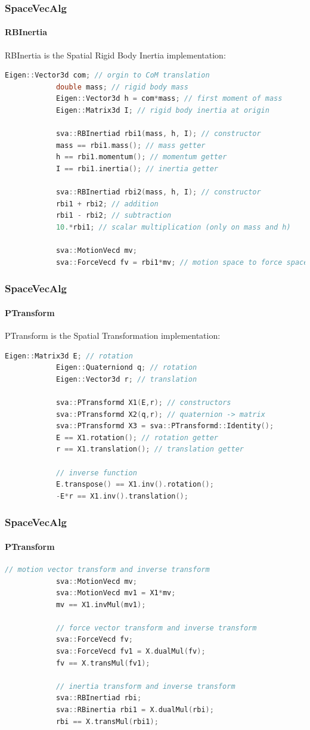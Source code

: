 \documentclass{beamer}
\begin{document}
  	\begin{frame}[fragile]
		\frametitle{SpaceVecAlg}
		\framesubtitle{RBInertia}
		RBInertia is the Spatial Rigid Body Inertia implementation:
		\begin{lstlisting}[language=C++]
			Eigen::Vector3d com; // orgin to CoM translation
			double mass; // rigid body mass
			Eigen::Vector3d h = com*mass; // first moment of mass
			Eigen::Matrix3d I; // rigid body inertia at origin

			sva::RBInertiad rbi1(mass, h, I); // constructor
			mass == rbi1.mass(); // mass getter
			h == rbi1.momentum(); // momentum getter
			I == rbi1.inertia(); // inertia getter

			sva::RBInertiad rbi2(mass, h, I); // constructor
			rbi1 + rbi2; // addition
			rbi1 - rbi2; // subtraction
			10.*rbi1; // scalar multiplication (only on mass and h)

			sva::MotionVecd mv;
			sva::ForceVecd fv = rbi1*mv; // motion space to force space
		\end{lstlisting}
	\end{frame}


  	\begin{frame}[fragile]
		\frametitle{SpaceVecAlg}
		\framesubtitle{PTransform}
		PTransform is the Spatial Transformation implementation:
		\begin{lstlisting}[language=C++]
			Eigen::Matrix3d E; // rotation
			Eigen::Quaterniond q; // rotation
			Eigen::Vector3d r; // translation

			sva::PTransformd X1(E,r); // constructors
			sva::PTransformd X2(q,r); // quaternion -> matrix
			sva::PTransformd X3 = sva::PTransformd::Identity();
			E == X1.rotation(); // rotation getter
			r == X1.translation(); // translation getter

			// inverse function
			E.transpose() == X1.inv().rotation();
			-E*r == X1.inv().translation();
		\end{lstlisting}
	\end{frame}
  	\begin{frame}[fragile]
		\frametitle{SpaceVecAlg}
		\framesubtitle{PTransform}
		\begin{lstlisting}[language=C++]
			// motion vector transform and inverse transform
			sva::MotionVecd mv;
			sva::MotionVecd mv1 = X1*mv;
			mv == X1.invMul(mv1);

			// force vector transform and inverse transform
			sva::ForceVecd fv;
			sva::ForceVecd fv1 = X.dualMul(fv);
			fv == X.transMul(fv1);

			// inertia transform and inverse transform
			sva::RBInertiad rbi;
			sva::RBinertia rbi1 = X.dualMul(rbi);
			rbi == X.transMul(rbi1);
		\end{lstlisting}
	\end{frame}
\end{document}
